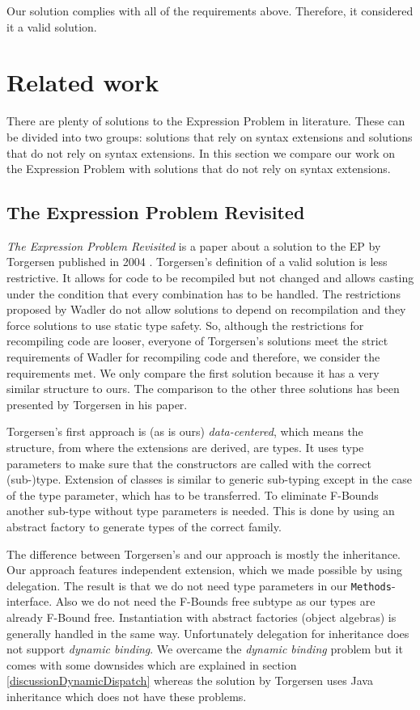 \documentclass{report}
\begin{document}
Our solution complies with all of the requirements above. Therefore, it considered it a valid solution.

\section{Related work}

There are plenty of solutions to the Expression Problem in literature. These can be divided into two groups: solutions that rely on syntax extensions and solutions that do not rely on syntax extensions. In this section we compare our work on the Expression Problem with solutions that do not rely on syntax extensions.

\subsection*{The Expression Problem Revisited}

\emph{The Expression Problem Revisited} is a paper about a solution to the EP by Torgersen published in 2004 \cite{Torgersen-Expression-2004}.
Torgersen's definition of a valid solution is less restrictive. It allows for code to be recompiled but not changed and allows casting under the condition that every combination has to be handled. The restrictions proposed by Wadler \cite{Wadler-Expression-1998} do not allow solutions to depend on recompilation and they force solutions to use static type safety. So, although the restrictions for recompiling code are looser, everyone of Torgersen's solutions meet the strict requirements of Wadler for recompiling code and therefore, we consider the requirements met. We only compare the first solution because it has a very similar structure to ours. The comparison to the other three solutions has been presented by Torgersen in his paper.

Torgersen's first approach is (as is ours) \emph{data-centered}, which means the structure, from where the extensions are derived, are types. It uses type parameters to make sure that the constructors are called with the correct (sub-)type. Extension of classes is similar to generic sub-typing except in the case of the type parameter, which has to be transferred. To eliminate F-Bounds another sub-type without type parameters is needed. This is done by using an abstract factory to generate types of the correct family.

The difference between Torgersen's and our approach is mostly the inheritance. Our approach features independent extension, which we made possible by using delegation. The result is that we do not need type parameters in our \lstinline{Methods}-interface. Also we do not need the F-Bounds free subtype as our types are already F-Bound free. Instantiation with abstract factories (object algebras) is generally handled in the same way.
Unfortunately delegation for inheritance does not support \emph{dynamic binding}. We overcame the \emph{dynamic binding} problem but it comes with some downsides which are explained in section \ref{discussionDynamicDispatch} whereas the solution by Torgersen uses Java inheritance which does not have these problems.
\end{document}

